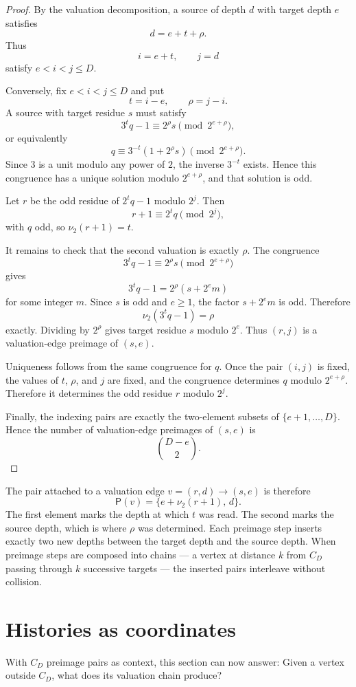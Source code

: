 \documentclass[11pt]{amsart}
\theoremstyle{definition}
\theoremstyle{remark}
\newcommand{\nuu}{\nu_2}
\newcommand{\Pair}{\mathsf P}
\begin{document}
\begin{proof}
By the valuation decomposition, a source of depth \(d\) with target depth
\(e\) satisfies
\[
d=e+t+\rho.
\]
Thus
\[
i=e+t,
\qquad
j=d
\]
satisfy \(e<i<j\le D\).

Conversely, fix \(e<i<j\le D\) and put
\[
t=i-e,
\qquad
\rho=j-i.
\]
A source with target residue \(s\) must satisfy
\[
3^tq-1\equiv 2^\rho s \pmod {2^{e+\rho}},
\]
or equivalently
\[
q\equiv 3^{-t}(1+2^\rho s)\pmod {2^{e+\rho}}.
\]
Since \(3\) is a unit modulo any power of \(2\), the inverse \(3^{-t}\)
exists.  Hence this congruence has a unique solution modulo
\(2^{e+\rho}\), and that solution is odd.

Let \(r\) be the odd residue of \(2^tq-1\) modulo \(2^j\).  Then
\[
r+1\equiv 2^tq \pmod {2^j},
\]
with \(q\) odd, so \(\nuu(r+1)=t\).

It remains to check that the second valuation is exactly \(\rho\).  The
congruence
\[
3^tq-1\equiv 2^\rho s \pmod {2^{e+\rho}}
\]
gives
\[
3^tq-1=2^\rho(s+2^e m)
\]
for some integer \(m\).  Since \(s\) is odd and \(e\ge1\), the factor
\(s+2^e m\) is odd.  Therefore
\[
\nuu(3^tq-1)=\rho
\]
exactly.  Dividing by \(2^\rho\) gives target residue \(s\) modulo
\(2^e\).  Thus \((r,j)\) is a valuation-edge preimage of \((s,e)\).

Uniqueness follows from the same congruence for \(q\).  Once the pair
\((i,j)\) is fixed, the values of \(t\), \(\rho\), and \(j\) are fixed,
and the congruence determines \(q\) modulo \(2^{e+\rho}\).  Therefore it
determines the odd residue \(r\) modulo \(2^j\).

Finally, the indexing pairs are exactly the two-element subsets of
\(\{e+1,\ldots,D\}\).  Hence the number of valuation-edge preimages of
\((s,e)\) is
\[
\binom{D-e}{2}.
\]
\end{proof}

The pair attached to a valuation edge $v=(r,d)\to(s,e)$ is therefore
\[
\Pair(v)=\{e+\nuu(r+1),\,d\}.
\]
The first element marks the depth at which $t$ was read. The second marks the source depth, which is where $\rho$ was determined.  Each preimage step inserts exactly two new depths between the target depth and the source depth.  When preimage steps are composed into chains — a vertex at distance $k$ from $C_D$ passing through $k$ successive targets — the inserted pairs interleave without collision.

\section{Histories as coordinates}\label{sec:histories}
With $C_D$ preimage pairs as context, this section can now answer:
Given a vertex outside $C_D$, what does its valuation chain produce?
\end{document}
